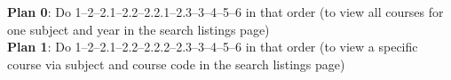 \documentclass[12pt]{article}
\begin{document}
\textbf{Plan 0}: Do 1--2--2.1--2.2--2.2.1--2.3--3--4--5--6 in that order (to view all courses for one subject and year in the search listings page)\\

\textbf{Plan 1}: Do 1--2--2.1--2.2--2.2.2--2.3--3--4--5--6 in that order (to view a specific course via subject and course code in the search listings page)
\end{document}
